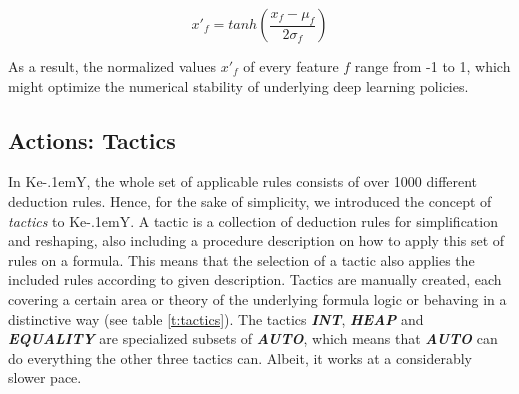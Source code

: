 \documentclass[runningheads,a4paper]{llncs}
\begin{document}
\begin{equation}
x'_{f} = tanh(\frac{x_f-\mu_f}{2\sigma_f})
\end{equation}

As a result, the normalized values $x'_f$ of every feature $f$ range from -1 to 1, which might optimize the numerical stability of underlying deep learning policies.


\subsection*{Actions: Tactics}
\label{ss:tac}

In Ke\kern-.1em{Y}, the whole set of applicable rules consists of over 1000 different deduction rules. Hence, for the sake of simplicity, we introduced the concept of \textit{tactics} to Ke\kern-.1em{Y}. A tactic is a collection of deduction rules for simplification and reshaping, also including a procedure description on how to apply this set of rules on a formula. This means that the selection of a tactic also applies the included rules according to given description. Tactics are manually created, each covering a certain area or theory of the underlying formula logic or behaving in a distinctive way (see table \ref{t:tactics}). The tactics \textbf{\textit{INT}}, \textbf{\textit{HEAP}} and \textbf{\textit{EQUALITY}} are specialized subsets of \textbf{\textit{AUTO}}, which means that \textbf{\textit{AUTO}} can do everything the other three tactics can. Albeit, it works at a considerably slower pace.
\end{document}
